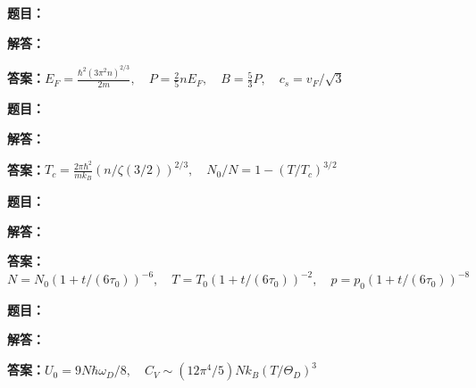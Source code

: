 \documentclass[lang=cn,color=blue,11pt]{elegantbook}
\begin{document}
\par
\noindent\textbf{题目：}
\par\noindent\textbf{解答：}
\par\noindent\textbf{答案：}\(\displaystyle E_F=\frac{\hbar^2(3\pi^2n)^{2/3}}{2m},\quad P=\frac25nE_F,\quad B=\frac53P,\quad c_s=v_F/\sqrt3\)\par
\par\smallskip\noindent\hrulefill\par\medskip
{}\par
\noindent\textbf{题目：}
\par\noindent\textbf{解答：}
\par\noindent\textbf{答案：}\(\displaystyle T_c=\frac{2\pi\hbar^2}{mk_B}(n/\zeta(3/2))^{2/3},\quad N_0/N=1-(T/T_c)^{3/2}\)\par
\par\smallskip\noindent\hrulefill\par\medskip
{}\par
\noindent\textbf{题目：}
\par\noindent\textbf{解答：}
\par\noindent\textbf{答案：}\(\displaystyle N=N_0(1+t/(6\tau_0))^{-6},\quad T=T_0(1+t/(6\tau_0))^{-2},\quad p=p_0(1+t/(6\tau_0))^{-8}\)\par
\par\smallskip\noindent\hrulefill\par\medskip
{}\par
\noindent\textbf{题目：}
\par\noindent\textbf{解答：}
\par\noindent\textbf{答案：}\(\displaystyle U_0=9N\hbar\omega_D/8,\quad C_V\sim(12\pi^4/5)Nk_B(T/\Theta_D)^3\)\par
\par\smallskip\noindent\hrulefill\par\medskip
\end{document}
